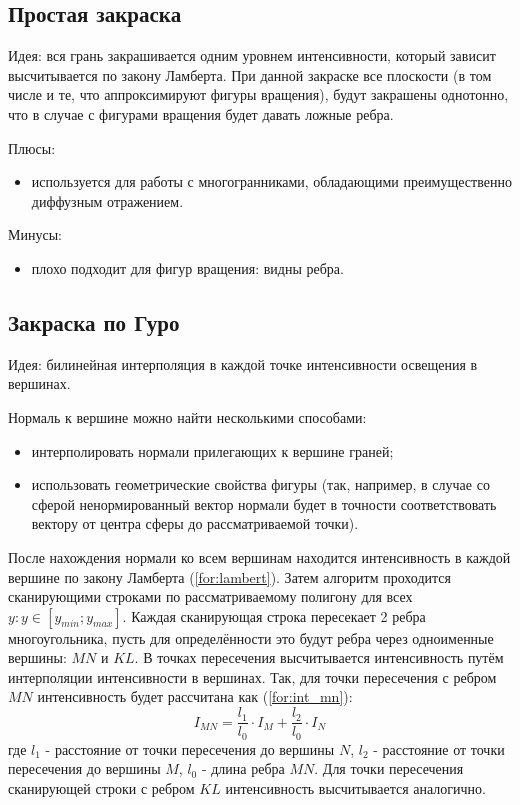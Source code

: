 \subsection{Простая закраска}

Идея: вся грань закрашивается одним уровнем интенсивности, который зависит высчитывается по закону Ламберта\cite{rogers}. При данной закраске все плоскости (в том числе и те, что аппроксимируют фигуры вращения), будут закрашены однотонно, что в случае с фигурами вращения будет давать ложные ребра.

Плюсы:
\begin{itemize}
    \item используется для работы с многогранниками, обладающими преимущественно диффузным отражением.
\end{itemize}

Минусы:

\begin{itemize}
    \item плохо подходит для фигур вращения: видны ребра.
\end{itemize}

\subsection{Закраска по Гуро}
Идея: билинейная интерполяция в каждой точке интенсивности освещения в вершинах\cite{lmodels}.

Нормаль к вершине можно найти несколькими способами:
\begin{itemize}
    \item интерполировать нормали прилегающих к вершине граней;
    \item использовать геометрические свойства фигуры (так, например, в случае со сферой ненормированный вектор нормали будет в точности соответствовать вектору от центра сферы до рассматриваемой точки).
\end{itemize}

После нахождения нормали ко всем вершинам находится интенсивность в каждой вершине по закону Ламберта (\ref{for:lambert}).
Затем алгоритм проходится сканирующими строками по рассматриваемому полигону для всех $y: y \in [y_{min}; y_{max}]$. Каждая сканирующая строка пересекает 2 ребра многоугольника, пусть для определённости это будут ребра через одноименные вершины: $MN$ и $KL$. В точках пересечения высчитывается интенсивность путём интерполяции интенсивности в вершинах. Так, для точки пересечения с ребром $MN$ интенсивность будет рассчитана как (\ref{for:int_mn}):
\begin{equation}
    \label{for:int_mn}
    I_{MN} = \frac{l_1}{l_0} \cdot I_M + \frac{l_2}{l_0} \cdot I_N
\end{equation}
где $l_1$ - расстояние от точки пересечения до вершины $N$, $l_2$ - расстояние от точки пересечения до вершины $M$, $l_0$ - длина ребра $MN$.
Для точки пересечения сканирующей строки с ребром $KL$ интенсивность высчитывается аналогично.

